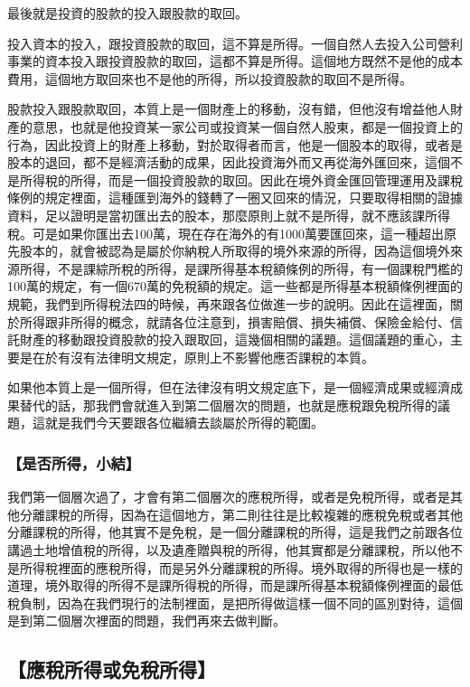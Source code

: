 \documentclass[oneside,sub3section]{ctexbook}
\begin{document}
最後就是投資的股款的投入跟股款的取回。

投入資本的投入，跟投資股款的取回，這不算是所得。一個自然人去投入公司營利事業的資本投入跟投資股款的取回，這都不算是所得。這個地方既然不是他的成本費用，這個地方取回來也不是他的所得，所以投資股款的取回不是所得。

股款投入跟股款取回，本質上是一個財產上的移動，沒有錯，但他沒有增益他人財產的意思，也就是他投資某一家公司或投資某一個自然人股東，都是一個投資上的行為，因此投資上的財產上移動，對於取得者而言，他是一個股本的取得，或者是股本的退回，都不是經濟活動的成果，因此投資海外而又再從海外匯回來，這個不是所得稅的所得，而是一個投資股款的取回。因此在境外資金匯回管理運用及課稅條例的規定裡面，這種匯到海外的錢轉了一圈又回來的情況，只要取得相關的證據資料，足以證明是當初匯出去的股本，那麼原則上就不是所得，就不應該課所得稅。可是如果你匯出去100萬，現在存在海外的有1000萬要匯回來，這一種超出原先股本的，就會被認為是屬於你納稅人所取得的境外來源的所得，因為這個境外來源所得，不是課綜所稅的所得，是課所得基本稅額條例的所得，有一個課稅門檻的100萬的規定，有一個670萬的免稅額的規定。這一些都是所得基本稅額條例裡面的規範，我們到所得稅法四的時候，再來跟各位做進一步的說明。因此在這裡面，關於所得跟非所得的概念，就請各位注意到，損害賠償、損失補償、保險金給付、信託財產的移動跟投資股款的投入跟取回，這幾個相關的議題。這個議題的重心，主要是在於有沒有法律明文規定，原則上不影響他應否課稅的本質。

如果他本質上是一個所得，但在法律沒有明文規定底下，是一個經濟成果或經濟成果替代的話，那我們會就進入到第二個層次的問題，也就是應稅跟免稅所得的議題，這就是我們今天要跟各位繼續去談屬於所得的範圍。

\hypertarget{ux662fux5426ux6240ux5f97ux5c0fux7d50}{%
\subsubsection{【是否所得，小結】}\label{ux662fux5426ux6240ux5f97ux5c0fux7d50}}

我們第一個層次過了，才會有第二個層次的應稅所得，或者是免稅所得，或者是其他分離課稅的所得，因為在這個地方，第二則往往是比較複雜的應稅免稅或者其他分離課稅的所得，他其實不是免稅，是一個分離課稅的所得，這是我們之前跟各位講過土地增值稅的所得，以及遺產贈與稅的所得，他其實都是分離課稅，所以他不是所得稅裡面的應稅所得，而是另外分離課稅的所得。境外取得的所得也是一樣的道理，境外取得的所得不是課所得稅的所得，而是課所得基本稅額條例裡面的最低稅負制，因為在我們現行的法制裡面，是把所得做這樣一個不同的區別對待，這個是到第二個層次裡面的問題，我們再來去做判斷。

\hypertarget{ux61c9ux7a05ux6240ux5f97ux6216ux514dux7a05ux6240ux5f97}{%
\subsection{【應稅所得或免稅所得】}\label{ux61c9ux7a05ux6240ux5f97ux6216ux514dux7a05ux6240ux5f97}}
\end{document}
